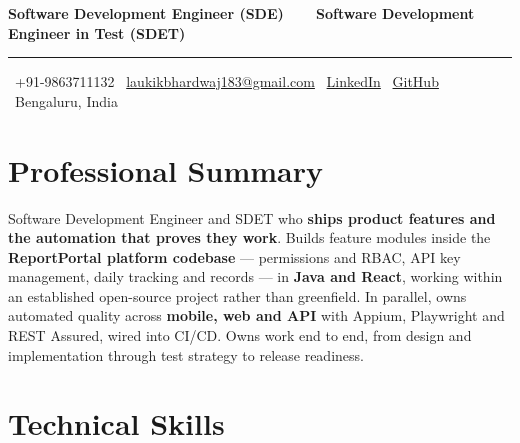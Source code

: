 \documentclass[a4paper,10pt]{article}
\newcommand{\lead}[1]{{\color{ink}\bfseries #1}}
\begin{document}
\begin{center}
  {\color{ink}\bfseries\fontsize{23}{26}\selectfont {}}

  \vspace{4pt}
  {\color{accent}\bfseries\fontsize{10}{12}\selectfont
   Software Development Engineer (SDE)\ \ \textbar\ \ Software Development Engineer in Test (SDET)}

  \vspace{5pt}
  {\color{accent}\rule{\textwidth}{1.2pt}}

  \vspace{4pt}
  {\color{muted}\small
    \faPhone*\ +91-9863711132 \quad
    \faEnvelope\ \href{mailto:laukikbhardwaj183@gmail.com}{laukikbhardwaj183@gmail.com} \quad
    \faLinkedin\ \href{https://www.linkedin.com/in/laukikupadhyay/}{LinkedIn} \quad
    \faGithub\ \href{https://github.com/laukikupadhyay}{GitHub} \quad
    \faMapMarker*\ Bengaluru, India
  }
\end{center}

\section{Professional Summary}

Software Development Engineer and SDET who \lead{ships product features and the automation that
proves they work}. Builds feature modules inside the \lead{ReportPortal platform codebase} —
permissions and RBAC, API key management, daily tracking and records — in \lead{Java and React},
working within an established open-source project rather than greenfield. In parallel, owns
automated quality across \lead{mobile, web and API} with Appium, Playwright and REST Assured,
wired into CI/CD. Owns work end to end, from design and implementation through test strategy to
release readiness.

\section{Technical Skills}
\end{document}
